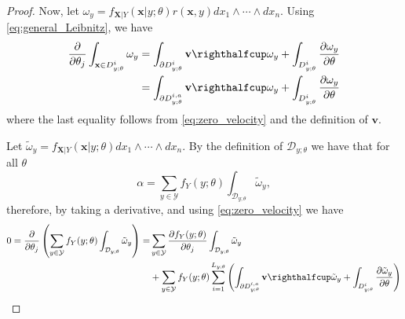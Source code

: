 \documentclass[letterpaper]{article}
\newcommand{\cD}{\mathcal{D}}
\newcommand{\cY}{\mathcal{Y}}
\newcommand{\bx}{\mathbf{x}}
\newcommand{\bX}{\mathbf{X}}
\newcommand{\Dth}{\frac{\partial}{\partial \theta_j}}
\newcommand{\Dt}[1]{\frac{\partial {#1}}{\partial \theta_j}}
\begin{document}
\begin{proof}
Now, let $\omega_y = f_{\bX|Y}(\bx|y;\theta) r(\bx,y) dx_1 \wedge \cdots \wedge dx_n$. Using \eqref{eq:general_Leibnitz}, we have
\begin{equation}\label{eq:proof_omega_leibnitz}
\begin{split}
\Dth \int_{\bx \in D_{y;\theta}^i} \omega_y &= \int_{\partial D_{y;\theta}^i} \mathbf{v} \righthalfcup \omega_y + \int_{D_{y;\theta}^i} \frac{\partial \omega_y}{\partial \theta} \\
&= \int_{\partial D_{y;\theta}^{i,a}} \mathbf{v} \righthalfcup \omega_y + \int_{D_{y;\theta}^i} \frac{\partial \omega_y}{\partial \theta}
\end{split}
\end{equation}
where the last equality follows from \eqref{eq:zero_velocity} and the definition of $\mathbf{v}$.

Let $\tilde{\omega}_y = f_{\bX|Y}(\bx|y;\theta) dx_1 \wedge \cdots \wedge dx_n$. By the definition of $\cD_{y;\theta}$ we have that for all $\theta$
\begin{equation*}
\alpha = \sum_{y\in \cY}f_Y(y;\theta) \int_{\cD_{y;\theta}} \tilde{\omega}_y,
\end{equation*}
therefore, by taking a derivative, and using \eqref{eq:zero_velocity} we have
\begin{equation}\label{eq:proof2}
\begin{split}
0 = \Dth \left(\sum_{y\in \cY}f_Y(y;\theta) \int_{\cD_{y;\theta}} \tilde{\omega}_y \right) =&
\sum_{y\in \cY}\Dt{f_Y(y;\theta)} \int_{\cD_{y;\theta}} \tilde{\omega}_y \\
&+\sum_{y\in \cY}f_Y(y;\theta) \sum_{i=1}^{L_{y;\theta}} \left(\int_{\partial D_{y;\theta}^{i,a}} \mathbf{v} \righthalfcup \tilde{\omega}_y + \int_{D_{y;\theta}^i} \frac{\partial \tilde{\omega}_y}{\partial \theta} \right)
\end{split}
\end{equation}



\end{proof}
\end{document}
